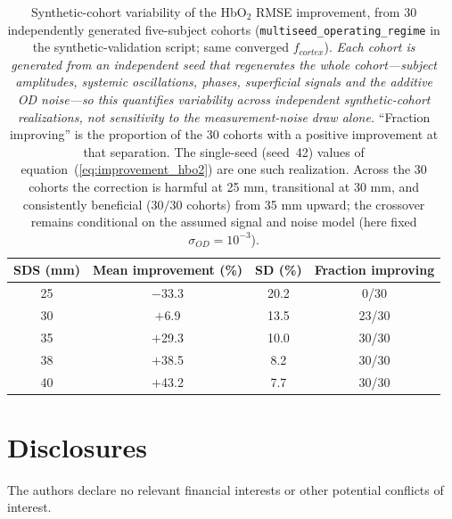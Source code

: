 \documentclass[11pt]{article}
\def\mathrm#1{#1}%
\def\,{ }%
\begin{document}
\begin{table}[ht]
\centering
\caption{Synthetic-cohort variability of the HbO$_2$ RMSE improvement, from 30 independently generated five-subject cohorts (\texttt{multiseed\_operating\_regime} in the synthetic-validation script; same converged $f_{\mathrm{cortex}}$). \emph{Each cohort is generated from an independent seed that regenerates the whole cohort---subject amplitudes, systemic oscillations, phases, superficial signals and the additive OD noise---so this quantifies variability across independent synthetic-cohort realizations, not sensitivity to the measurement-noise draw alone.} ``Fraction improving'' is the proportion of the 30 cohorts with a positive improvement at that separation. The single-seed (seed~42) values of equation~(\ref{eq:improvement_hbo2}) are one such realization. Across the 30 cohorts the correction is harmful at 25\,mm, transitional at 30\,mm, and consistently beneficial ($30/30$ cohorts) from 35\,mm upward; the crossover remains conditional on the assumed signal and noise model (here fixed $\sigma_{\mathrm{OD}}=10^{-3}$).}
\label{tab:multiseed}
\begin{tabular}{@{}cccc@{}}
\toprule
\textbf{SDS (mm)} & \textbf{Mean improvement (\%)} & \textbf{SD (\%)} & \textbf{Fraction improving} \\
\midrule
25 & $-$33.3 & 20.2 & 0/30 \\
30 & $+$6.9  & 13.5 & 23/30 \\
35 & $+$29.3 & 10.0 & 30/30 \\
38 & $+$38.5 & 8.2  & 30/30 \\
40 & $+$43.2 & 7.7  & 30/30 \\
\bottomrule
\end{tabular}
\end{table}

\section*{Disclosures}
The authors declare no relevant financial interests or other potential conflicts of interest.
\end{document}
